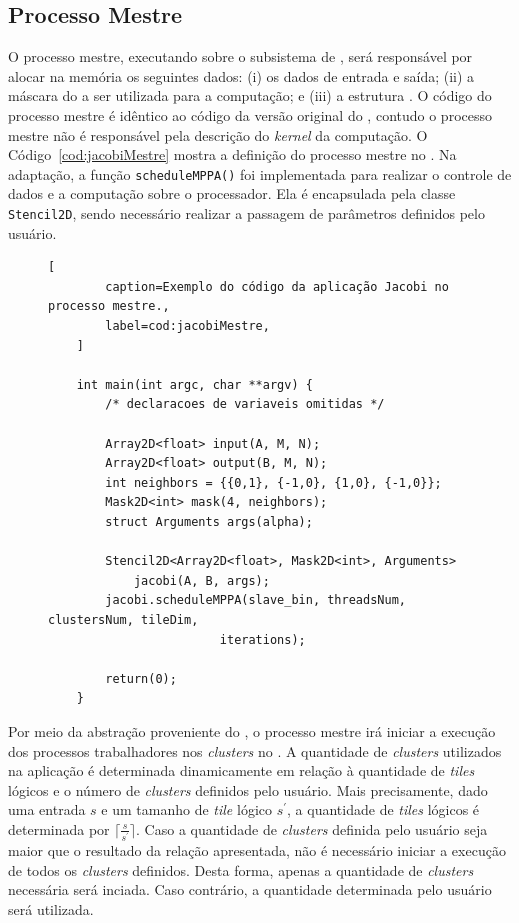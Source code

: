 \subsection{Processo Mestre}
O processo mestre, executando sobre o subsistema de \es, será responsável por
alocar na memória \lpddr os seguintes dados: (i) os dados de entrada e saída; (ii) a máscara do \stencil a ser utilizada para a computação; e
(iii) a estrutura \stencil. O código do processo mestre é idêntico ao código da versão
original do \pskel, contudo o processo mestre não é responsável pela descrição
do \textit{kernel} da computação. O Código~\ref{cod:jacobiMestre} mostra a
definição do processo mestre no \mppa.  Na adaptação, a função
\texttt{scheduleMPPA()} foi implementada para realizar o controle de dados e a
computação sobre o processador. Ela é encapsulada pela classe
\texttt{Stencil2D}, sendo necessário realizar a passagem de parâmetros definidos
pelo usuário.

\newlength\someheight
\setlength\someheight{3cm}

\begin{figure}[t]
	\begin{lstlisting}[
		caption=Exemplo do código da aplicação Jacobi no processo mestre.,
		label=cod:jacobiMestre,
	]

	int main(int argc, char **argv) {
		/* declaracoes de variaveis omitidas */

		Array2D<float> input(A, M, N);
		Array2D<float> output(B, M, N);
		int neighbors = {{0,1}, {-1,0}, {1,0}, {-1,0}};
		Mask2D<int> mask(4, neighbors);
		struct Arguments args(alpha);

		Stencil2D<Array2D<float>, Mask2D<int>, Arguments>
			jacobi(A, B, args);
		jacobi.scheduleMPPA(slave_bin, threadsNum, clustersNum, tileDim,
                        iterations);

		return(0);
	}
\end{lstlisting}
\end{figure}

Por meio da abstração proveniente do \pskel, o processo mestre irá iniciar a
execução dos processos trabalhadores nos \textit{clusters} no \mppa. A
quantidade de \textit{clusters} utilizados na aplicação é determinada
dinamicamente em relação à quantidade de \textit{tiles} lógicos e o número de
\textit{clusters} definidos pelo usuário.  Mais precisamente, dado uma entrada
$s$ e um tamanho de \textit{tile} lógico $s^\prime$, a quantidade de
\textit{tiles} lógicos é determinada por $\lceil\frac{s}{s^\prime}\rceil$. Caso
a quantidade de \textit{clusters} definida pelo usuário seja maior que o
resultado da relação apresentada, não é necessário iniciar a execução de todos
os \textit{clusters} definidos. Desta forma, apenas a quantidade de
\textit{clusters} necessária será inciada. Caso contrário, a quantidade
determinada pelo usuário será utilizada.

